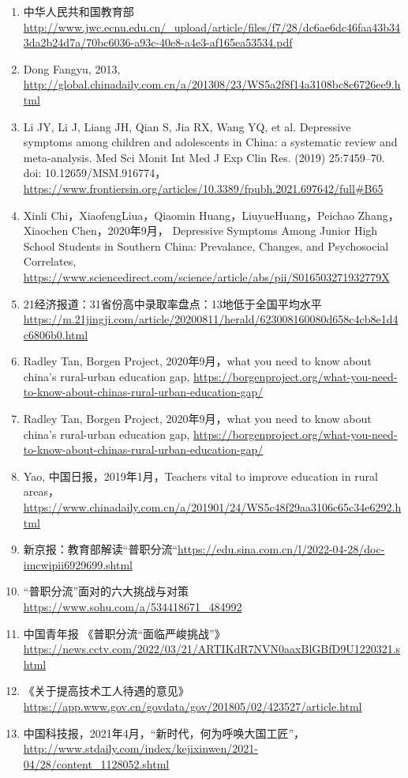 \documentclass[12pt,UTF8]{ctexart}
\begin{document}
\begin{enumerate}[1.]
	\item 中华人民共和国教育部\url{http://www.jwc.ecnu.edu.cn/_upload/article/files/f7/28/dc6ae6dc46faa43b343da2b24d7a/70bc6036-a93c-40e8-a4e3-af165ea53534.pdf}
	\item Dong Fangyu, 2013, \url{http://global.chinadaily.com.cn/a/201308/23/WS5a2f8f14a3108bc8c6726ee9.html}
	\item Li JY, Li J, Liang JH, Qian S, Jia RX, Wang YQ, et al. Depressive symptoms among children and adolescents in China: a systematic review and meta-analysis. Med Sci Monit Int Med J Exp Clin Res. (2019) 25:7459–70. doi: 10.12659/MSM.916774，\url{https://www.frontiersin.org/articles/10.3389/fpubh.2021.697642/full#B65}
	\item Xinli Chi，XiaofengLiua，Qiaomin Huang，LiuyueHuang，Peichao Zhang，Xiaochen Chen，2020年9月， Depressive Symptoms Among Junior High School Students in Southern China: Prevalance, Changes, and Psychosocial Correlates, \url{https://www.sciencedirect.com/science/article/abs/pii/S016503271932779X}
	\item 21经济报道：31省份高中录取率盘点：13地低于全国平均水平\url{https://m.21jingji.com/article/20200811/herald/623008160080d658c4cb8e1d4c6806b0.html}
	\item Radley Tan, Borgen Project, 2020年9月，what you need to know about china's rural-urban education gap, \url{https://borgenproject.org/what-you-need-to-know-about-chinas-rural-urban-education-gap/}
	\item Radley Tan, Borgen Project, 2020年9月，what you need to know about china's rural-urban education gap, \url{https://borgenproject.org/what-you-need-to-know-about-chinas-rural-urban-education-gap/}
	\item Yao, 中国日报，2019年1月，Teachers vital to improve education in rural areas，\url{https://www.chinadaily.com.cn/a/201901/24/WS5c48f29aa3106c65c34e6292.html}
	\item 新京报：教育部解读“普职分流“\url{https://edu.sina.com.cn/l/2022-04-28/doc-imcwipii6929699.shtml}
	\item “普职分流”面对的六大挑战与对策\url{https://www.sohu.com/a/534418671_484992}
	\item 中国青年报 《普职分流“面临严峻挑战”》\url{https://news.cctv.com/2022/03/21/ARTIKdR7NVN0aaxBlGBfD9U1220321.shtml}
	\item 《关于提高技术工人待遇的意见》\url{https://app.www.gov.cn/govdata/gov/201805/02/423527/article.html}
	\item 中国科技报，2021年4月，“新时代，何为呼唤大国工匠”，\url{http://www.stdaily.com/index/kejixinwen/2021-04/28/content_1128052.shtml}

\end{enumerate}
\end{document}
